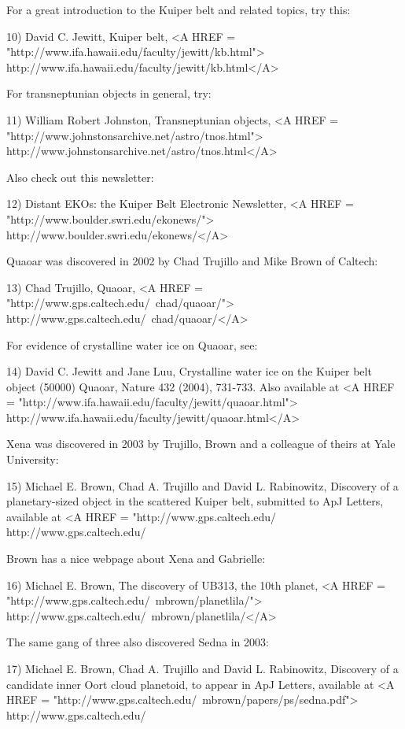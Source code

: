For a great introduction to the Kuiper belt and related topics, try
this:

10) David C. Jewitt, Kuiper belt, 
<A HREF = "http://www.ifa.hawaii.edu/faculty/jewitt/kb.html">
http://www.ifa.hawaii.edu/faculty/jewitt/kb.html</A>

For transneptunian objects in general, try:
 
11) William Robert Johnston, Transneptunian objects,
<A HREF = "http://www.johnstonsarchive.net/astro/tnos.html">
http://www.johnstonsarchive.net/astro/tnos.html</A>

Also check out this newsletter:

12) Distant EKOs: the Kuiper Belt Electronic Newsletter,
<A HREF = "http://www.boulder.swri.edu/ekonews/">
http://www.boulder.swri.edu/ekonews/</A>

Quaoar was discovered in 2002 by Chad Trujillo and Mike Brown of 
Caltech:

13) Chad Trujillo, Quaoar, 
<A HREF = "http://www.gps.caltech.edu/~chad/quaoar/">
http://www.gps.caltech.edu/~chad/quaoar/</A>

For evidence of crystalline water ice on Quaoar, see:

14) David C. Jewitt and Jane Luu, Crystalline water ice on the Kuiper
belt object (50000) Quaoar, Nature 432 (2004), 731-733.  
Also available at
<A HREF = "http://www.ifa.hawaii.edu/faculty/jewitt/quaoar.html">
http://www.ifa.hawaii.edu/faculty/jewitt/quaoar.html</A>

Xena was discovered in 2003 by Trujillo, Brown and a colleague of
theirs at Yale University:

15) Michael E. Brown, Chad A. Trujillo and David L. Rabinowitz,
Discovery of a planetary-sized object in the scattered Kuiper belt, 
submitted to ApJ Letters, available at
<A HREF = "http://www.gps.caltech.edu/%
http://www.gps.caltech.edu/%

Brown has a nice webpage about Xena and Gabrielle:

16) Michael E. Brown, The discovery of UB313, the 10th planet,
<A HREF = "http://www.gps.caltech.edu/~mbrown/planetlila/">
http://www.gps.caltech.edu/~mbrown/planetlila/</A>

The same gang of three also discovered Sedna in 2003:

17) Michael E. Brown, Chad A. Trujillo and David L. Rabinowitz,
Discovery of a candidate inner Oort cloud planetoid, to appear
in ApJ Letters, available at
<A HREF = "http://www.gps.caltech.edu/~mbrown/papers/ps/sedna.pdf">
http://www.gps.caltech.edu/%

